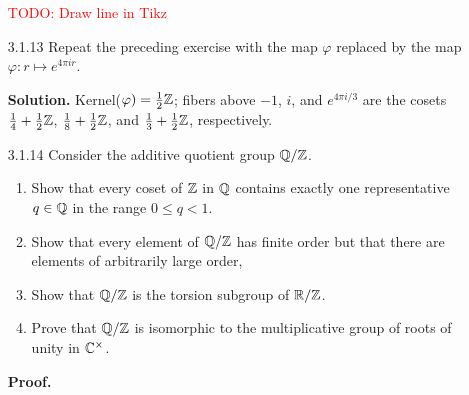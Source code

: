 \begin{enumerate}
      \textcolor{red}{TODO: Draw line in Tikz}
   \item[3.1.13]  Repeat the preceding exercise with the map $\varphi$ replaced
                  by the map $\varphi : r \mapsto e^{4\pi ir}$.

      \textbf{Solution.} Kernel($\varphi) = \frac{1}{2}\mathbb{Z}$; fibers above $-1$,
      $i$, and $e^{4\pi i/3}$ are the cosets
      $\frac{1}{4} + \frac{1}{2}\mathbb{Z}$, $\frac{1}{8} + \frac{1}{2}\mathbb{Z}$, and
      $\frac{1}{3} + \frac{1}{2}\mathbb{Z}$, respectively.
   \item[3.1.14]  Consider the additive quotient group $\mathbb{Q}/\mathbb{Z}$.
                  \begin{enumerate}
                     \item Show that every coset of $\mathbb{Z}$ in $\mathbb{Q}$ contains
                           exactly one representative $q \in \mathbb{Q}$ in the range
                           $0 \le q < 1$.
                     \item Show that every element of $\mathbb{Q}/\mathbb{Z}$ has finite order
                           but that there are elements of arbitrarily large
                           order,
                     \item Show that $\mathbb{Q}/\mathbb{Z}$ is the torsion subgroup of $\mathbb{R}/\mathbb{Z}$.
                     \item Prove that $\mathbb{Q}/\mathbb{Z}$ is isomorphic to the
                           multiplicative group of roots of unity in
                           $\mathbb{C}^\times$.
                  \end{enumerate}

      \textbf{Proof.}


\end{enumerate}
